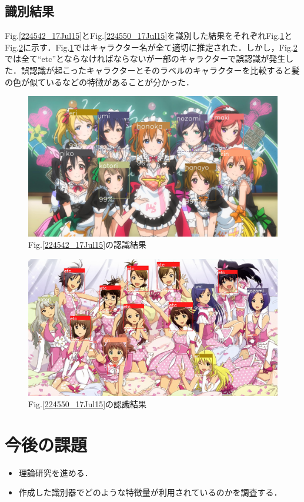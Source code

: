 \documentclass[a4paper,10pt]{jsarticle}
\begin{document}
\subsection{識別結果}
Fig.\ref{224542_17Jul15}とFig.\ref{224550_17Jul15}を識別した結果をそれぞれFig.\ref{224817_17Jul15}とFig.\ref{224823_17Jul15}に示す．Fig.\ref{224817_17Jul15}ではキャラクター名が全て適切に推定された．しかし，Fig.\ref{224823_17Jul15}では全て``etc''とならなければならないが一部のキャラクターで誤認識が発生した．誤認識が起こったキャラクターとそのラベルのキャラクターを比較すると髪の色が似ているなどの特徴があることが分かった．
\begin{figure}[ht]
 \centering
 \includegraphics[scale = 1.0]{fig/jpg/result_lovelive.jpg}
 \caption{Fig.\ref{224542_17Jul15}の認識結果 }
 \label{224817_17Jul15}
\end{figure}
\begin{figure}[ht]
 \centering
 \includegraphics[scale = 1.0]{fig/jpg/result_idolmaster.jpg}
 \caption{Fig.\ref{224550_17Jul15}の認識結果 }
 \label{224823_17Jul15}
\end{figure}



\section{今後の課題}
\begin{itemize}
 \item 理論研究を進める．
 \item 作成した識別器でどのような特徴量が利用されているのかを調査する．
\end{itemize}
\end{document}
